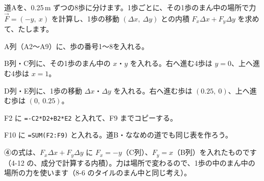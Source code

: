 \begin{yattemiyou}
道Aを、0.25\,m ずつの8歩に分けます。1歩ごとに、その1歩のまん中の場所で力 $\vec F=(-y,\ x)$ を計算し、1歩の移動 $(\Delta x,\ \Delta y)$ との内積 $F_x\Delta x+F_y\Delta y$ を求めて、たします。
\begin{enumerate}[label={\bkcircled[bkGreen]{\arabic*}}, leftmargin=2.4\zw, itemsep=1pt, topsep=3pt]
\item A列（A2〜A9）に、歩の番号1〜8を入れる。
\item B列・C列に、その1歩のまん中の $x$・$y$ を入れる。右へ進む4歩は $y=0$、上へ進む4歩は $x=1$。
\item D列・E列に、1歩の移動 $\Delta x$・$\Delta y$ を入れる。右へ進む歩は $(0.25,\ 0)$、上へ進む歩は $(0,\ 0.25)$。
\item F2 に \texttt{=-C2*D2+B2*E2} と入れて、F9 までコピーする。
\item F10 に \texttt{=SUM(F2:F9)} と入れる。道B・ななめの道でも同じ表を作ろう。
\end{enumerate}
\end{yattemiyou}

\noindent ④の式は、$F_x\Delta x+F_y\Delta y$ に $F_x=-y$（C列）、$F_y=x$（B列）を入れたものです（4-12 の、成分で計算する内積）。力は場所で変わるので、1歩の中のまん中の場所の力を使います（8-6 のタイルのまん中と同じ考え）。

\begin{bkcenter}
\label{bk:8-7:tab-sheet}
\end{bkcenter}

